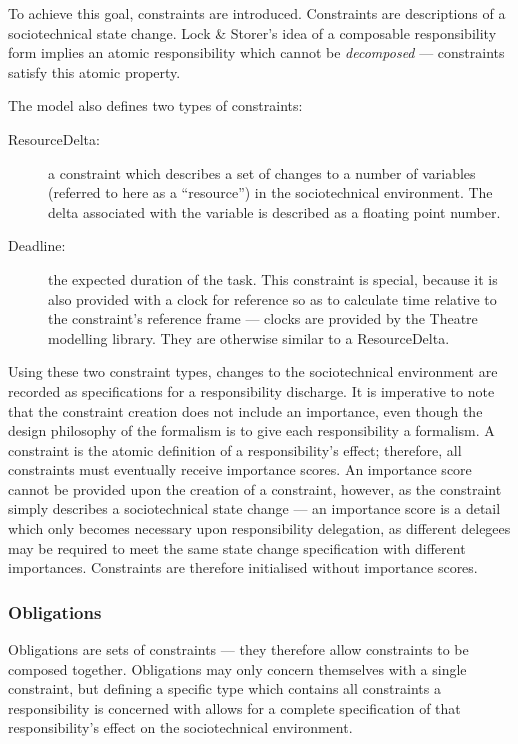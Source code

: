 To achieve this goal, constraints are introduced. Constraints are descriptions of a sociotechnical state change. Lock \& Storer's idea of a composable responsibility form implies an atomic responsibility which cannot be \emph{decomposed} --- constraints satisfy this atomic property.\par

The model also defines two types of constraints:

\begin{description}
    \item [ResourceDelta: ] a constraint which describes a set of changes to a number of variables (referred to here as a ``resource'') in the sociotechnical environment. The delta associated with the variable is described as a floating point number.
    \item [Deadline: ] the expected duration of the task. This constraint is special, because it is also provided with a clock for reference so as to calculate time relative to the constraint's reference frame --- clocks are provided by the Theatre modelling library\cite{theatre_code}. They are otherwise similar to a ResourceDelta.
\end{description}

Using these two constraint types, changes to the sociotechnical environment are recorded as specifications for a responsibility discharge. It is imperative to note that the constraint creation does not include an importance, even though the design philosophy of the formalism is to give each responsibility a formalism. A constraint is the atomic definition of a responsibility's effect; therefore, all constraints must eventually receive importance scores. An importance score cannot be provided upon the creation of a constraint, however, as the constraint simply describes a sociotechnical state change --- an importance score is a detail which only becomes necessary upon responsibility delegation, as different delegees may be required to meet the same state change specification with different importances. Constraints are therefore initialised without importance scores.\par

\subsubsection{Obligations}  %
Obligations are sets of constraints --- they therefore allow constraints to be composed together. Obligations may only concern themselves with a single constraint, but defining a specific type which contains all constraints a responsibility is concerned with allows for a complete specification of that responsibility's effect on the sociotechnical environment.\par


